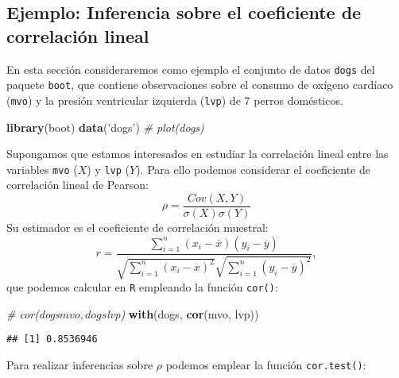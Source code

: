 \documentclass[
]{book}
\newenvironment{Shaded}{\begin{snugshade}}{\end{snugshade}}
\newcommand{\CommentTok}[1]{\textcolor[rgb]{0.56,0.35,0.01}{\textit{#1}}}
\newcommand{\KeywordTok}[1]{\textcolor[rgb]{0.13,0.29,0.53}{\textbf{#1}}}
\newcommand{\NormalTok}[1]{#1}
\newcommand{\OperatorTok}[1]{\textcolor[rgb]{0.81,0.36,0.00}{\textbf{#1}}}
\newcommand{\StringTok}[1]{\textcolor[rgb]{0.31,0.60,0.02}{#1}}
\theoremstyle{definition}
\theoremstyle{definition}
\theoremstyle{definition}
\theoremstyle{remark}
\begin{document}
\hypertarget{ejemplo-inferencia-sobre-el-coeficiente-de-correlaciuxf3n-lineal}{%
\subsection{Ejemplo: Inferencia sobre el coeficiente de correlación lineal}\label{ejemplo-inferencia-sobre-el-coeficiente-de-correlaciuxf3n-lineal}}

En esta sección consideraremos como ejemplo el conjunto de datos \texttt{dogs}
del paquete \texttt{boot}, que contiene observaciones sobre el consumo de
oxígeno cardíaco (\texttt{mvo}) y la presión ventricular izquierda (\texttt{lvp})
de 7 perros domésticos.

\begin{Shaded}
\begin{Highlighting}[]
\KeywordTok{library}\NormalTok{(boot)}
\KeywordTok{data}\NormalTok{(}\StringTok{'dogs'}\NormalTok{)}
\CommentTok{# plot(dogs)}
\end{Highlighting}
\end{Shaded}

Supongamos que estamos interesados en estudiar la correlación lineal
entre las variables \texttt{mvo} (\(X\)) y \texttt{lvp} (\(Y\)).
Para ello podemos considerar el coeficiente de correlación lineal de Pearson:
\[\rho =\frac{ Cov \left( X, Y \right) }
{ \sigma \left( X \right) \sigma \left( Y \right) }\]
Su estimador es el coeficiente de correlación muestral:
\[r=\frac{\sum_{i=1}^{n}(x_i-\overline{x})(y_i-\overline{y})}
{\sqrt{ \sum_{i=1}^{n}(x_i-\overline{x})^{2}} 
\sqrt{\sum_{i=1}^{n}(y_i-\overline{y})^{2}}},\]
que podemos calcular en \texttt{R} empleando la función \texttt{cor()}:

\begin{Shaded}
\begin{Highlighting}[]
\CommentTok{# cor(dogs$mvo, dogs$lvp)}
\KeywordTok{with}\NormalTok{(dogs, }\KeywordTok{cor}\NormalTok{(mvo, lvp))}
\end{Highlighting}
\end{Shaded}

\begin{verbatim}
## [1] 0.8536946
\end{verbatim}

Para realizar inferencias sobre \(\rho\) podemos emplear la función
\texttt{cor.test()}:

\begin{Shaded}
\end{Shaded}
\end{document}
